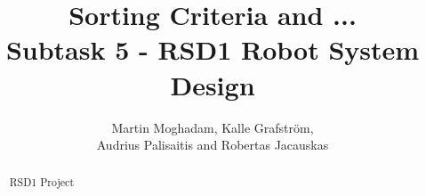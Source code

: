 \documentclass[a4paper]{article}	%
\begin{document}
\begin{titlepage}
\title{\Huge \bfseries Sorting Criteria and ... \vspace{3 mm}\\ \Large \normalfont Subtask 5 - RSD1 Robot System Design\vspace{10mm}}   %
\author{Martin Moghadam, Kalle Grafstr\"{o}m, \\ Audrius Palisaitis and Robertas Jacauskas}         %
\maketitle

\begin{abstract}
RSD1 Project
\end{abstract}

\end{titlepage}


\setcounter{page}{1}

\newpage
\tableofcontents
\newpage

\setcounter{page}{1}













\nocite{bib1} 
\nocite{bib2}
\nocite{bib3}
\nocite{bib4}
\nocite{bib5}
\nocite{bib6}
\nocite{bib7}


\end{document}
